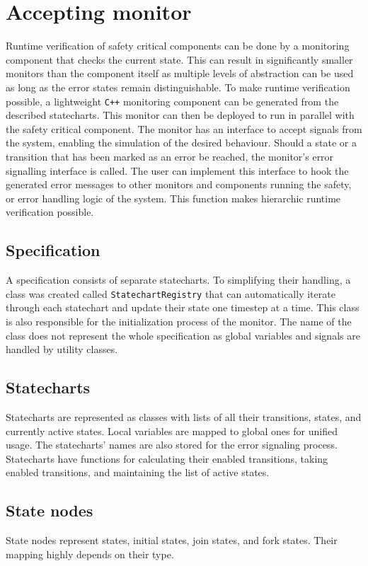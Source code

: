 \section{Accepting monitor}
Runtime verification of safety critical components can be done by a monitoring component that checks the current state. This can result in significantly smaller monitors than the component itself as multiple levels of abstraction can be used as long as the error states remain distinguishable. To make runtime verification possible, a lightweight \verb!C++! monitoring component can be generated from the described statecharts. This monitor can then be deployed to run in parallel with the safety critical component. The monitor has an interface to accept signals from the system, enabling the simulation of the desired behaviour. Should a state or a transition that has been marked as an error be reached, the monitor's error signalling interface is called. The user can implement this interface to hook the generated error messages to other monitors and components running the safety, or error handling logic of the system. This function makes hierarchic runtime verification possible.
  \subsection{Specification}
A specification consists of separate statecharts. To simplifying their handling, a class was created called \verb!StatechartRegistry! that can automatically iterate through each statechart and update their state one timestep at a time. This class is also responsible for the initialization process of the monitor. The name of the class does not represent the whole specification as global variables and signals are handled by utility classes.
  \subsection{Statecharts}
Statecharts are represented as classes with lists of all their transitions, states, and currently active states. Local variables are mapped to global ones for unified usage. The statecharts' names are also stored for the error signaling process. Statecharts have functions for calculating their enabled transitions, taking enabled transitions, and maintaining the list of active states.
  \subsection{State nodes}
State nodes represent states, initial states, join states, and fork states. Their mapping highly depends on their type.
